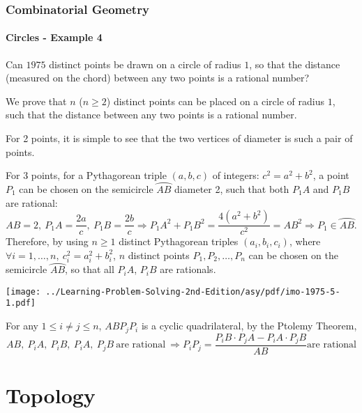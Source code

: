 \documentclass[8pt,xcolor=table,dvipsnames]{beamer}
\newcommand{\arc}[1]{\wideparen{#1}}
\begin{document}
\begin{frame}[t]
    \frametitle{Combinatorial Geometry}
    \framesubtitle{Circles - Example 4}
    \begin{example}[IMO 1975/5]
        Can $1975$ distinct points be drawn on a circle of radius $1$,
        so that the distance (measured on the chord) between any two points is a rational number?
    \end{example}
    \begin{overprint}
        We prove that $n$ ($n\ge 2$) distinct points can be placed on a circle of radius $1$,
        such that the distance between any two points is a rational number.
    
        \bigbreak
        For 2 points, it is simple to see that the two vertices of diameter is such a pair of points.
        
        \bigbreak
        For 3 points, for a Pythagorean triple $(a, b, c)$ of integers: $c^2=a^2+b^2$,
        a point $P_1$ can be chosen on the semicircle $\arc{AB}$ diameter 2, 
        such that both $P_1A$ and $P_1B$ are rational:
        \[
            AB=2,\ P_1A=\frac{2a}{c},\ P_1B=\frac{2b}{c} \Rightarrow P_1A^2+P_1B^2 = \frac{4(a^2+b^2)}{c^2}=AB^2
            \Rightarrow P_1 \in \arc{AB}.
        \]
        Therefore, by using $n \ge 1$ distinct Pythagorean triples $(a_i,b_i,c_i)$, where
        $\forall i=1,\ldots,n,\ c_i^2=a_i^2+b_i^2$,
        $n$ distinct points $P_1,P_2,\ldots,P_n$ can be chosen on the semicircle $\arc{AB}$,
        so that all $P_iA$, $P_iB$ are rationals.
        \begin{center}
            \texttt{[image: ../Learning-Problem-Solving-2nd-Edition/asy/pdf/imo-1975-5-1.pdf]}
        \end{center}
        For any $1 \le i \ne j \le n$, $ABP_jP_i$ is a cyclic quadrilateral,
        by the Ptolemy Theorem,
        \[
            AB,\ P_iA,\ P_iB,\ P_iA,\ P_jB\ \text{are rational}\ \Rightarrow
            P_iP_j = \frac{P_iB \cdot P_jA - P_iA \cdot P_jB}{AB} \text{are rational}
        \]
    \end{overprint}
\end{frame}

\section{Topology}
\end{document}
